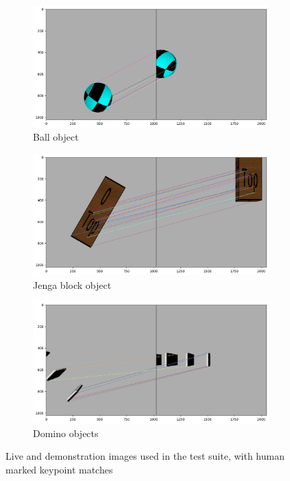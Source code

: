 \begin{figure}[h]
    \begin{subfigure}[b]{0.49\textwidth}
        \includegraphics[width=\textwidth]{figures/matchBall.png}
        \caption{Ball object}
    \end{subfigure}
    \hfill
    \begin{subfigure}[b]{0.49\textwidth}
        \includegraphics[width=\textwidth]{figures/matchJenga.png}
        \caption{Jenga block object}
    \end{subfigure}
    
    \begin{subfigure}[b]{0.49\textwidth}
        \includegraphics[width=\textwidth]{figures/matchDominoes.png}
        \caption{Domino objects}
    \end{subfigure}
    \caption{Live and demonstration images used in the test suite, with human marked keypoint matches}
    \label{fig:testImages}
\end{figure}

